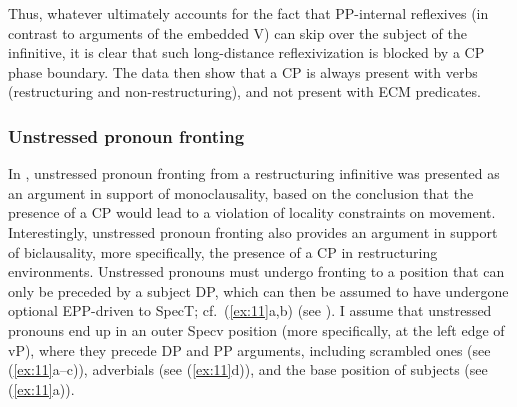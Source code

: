 \documentclass[output=paper]{langsci/langscibook}
\begin{document}
Thus, whatever ultimately accounts for the fact that PP-internal reflexives (in
contrast to arguments of the embedded V) can skip over the subject of the
infinitive, it is clear that such long-distance reflexivization is blocked by a
CP phase boundary. The data then show that a CP is always present with 
verbs (restructuring and non-restructuring), and not present with ECM
predicates.

\subsubsection{\label{b4}Unstressed pronoun fronting}

In , unstressed pronoun fronting from a restructuring infinitive was
presented as an argument in support of monoclausality, based on the conclusion
that the presence of a CP would lead to a violation of locality constraints on
movement. Interestingly, unstressed pronoun fronting also provides an argument
in support of biclausality, more specifically, the presence of a CP in
restructuring environments.  Unstressed pronouns must undergo fronting to a
position that can only be preceded by a subject DP, which can then be assumed
to have undergone optional \gls{EPP}-driven  to SpecT; cf.\ (\ref{ex:11}a,b)
(see \citealt{Mueller:01:par,Fanselow:04:sup}).  I assume that unstressed
pronouns end up in an outer Specv position (more specifically, at the left edge
of vP), where they precede DP and PP arguments, including scrambled ones (see
(\ref{ex:11}a--c)), adverbials (see (\ref{ex:11}d)), and the base position of
subjects (see (\ref{ex:11}a)).

\ea\label{ex:11} 
    \z
\z
\end{document}
